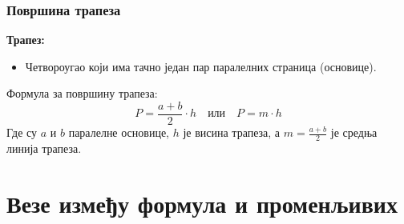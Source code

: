 \documentclass{beamer}
\begin{document}
\begin{frame}
\frametitle{Површина трапеза}
\textbf{Трапез:}
\begin{itemize}
    \item Четвороугао који има тачно један пар паралелних страница (основице).
\end{itemize}
Формула за површину трапеза:
$$P = \frac{a+b}{2} \cdot h \quad \text{или} \quad P = m \cdot h$$
Где су $a$ и $b$ паралелне основице, $h$ је висина трапеза, а $m = \frac{a+b}{2}$ је средња линија трапеза.
\begin{figure}
    \centering
\end{figure}
\end{frame}

\section{Везе између формула и променљивих}
\end{document}
